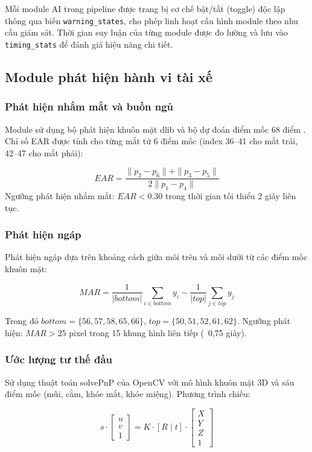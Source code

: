 Mỗi module AI trong pipeline được trang bị cơ chế bật/tắt (toggle) độc lập thông qua biến {\tt warning\_states}, cho phép linh hoạt cấu hình module theo nhu cầu giám sát. Thời gian suy luận của từng module được đo lường và lưu vào {\tt timing\_stats} để đánh giá hiệu năng chi tiết.

\subsection{Module phát hiện hành vi tài xế}

\subsubsection{Phát hiện nhắm mắt và buồn ngủ}
Module sử dụng bộ phát hiện khuôn mặt dlib và bộ dự đoán điểm mốc 68 điểm \cite{king2009}. Chỉ số EAR được tính cho từng mắt từ 6 điểm mốc (index 36--41 cho mắt trái, 42--47 cho mắt phải):

\begin{equation}
EAR = \frac{\|p_2 - p_6\| + \|p_3 - p_5\|}{2\|p_1 - p_4\|}
\label{eq:ear}
\end{equation}
Ngưỡng phát hiện nhắm mắt: $EAR < 0.30$ trong thời gian tối thiểu 2 giây liên tục.
\subsubsection{Phát hiện ngáp}
Phát hiện ngáp dựa trên khoảng cách giữa môi trên và môi dưới từ các điểm mốc khuôn mặt:

\begin{equation}
MAR = \frac{1}{|bottom|} \sum_{i \in bottom} y_i - \frac{1}{|top|} \sum_{j \in top} y_j
\label{eq:mar}
\end{equation}

Trong đó $bottom = \{56,57,58,65,66\}$, $top = \{50,51,52,61,62\}$.
Ngưỡng phát hiện: $MAR > 25$ pixel trong 15 khung hình liên tiếp (~0,75 giây).

\subsubsection{Ước lượng tư thế đầu}

Sử dụng thuật toán solvePnP của OpenCV với mô hình khuôn mặt 3D và sáu điểm mốc (mũi, cằm, khóe mắt, khóe miệng). Phương trình chiếu:

\begin{equation}
s \cdot \begin{bmatrix} u \\ v \\ 1 \end{bmatrix} = 
K \cdot [R \;|\; t] \cdot \begin{bmatrix} X \\ Y \\ Z \\ 1 \end{bmatrix}
\label{eq:pnp}
\end{equation}

